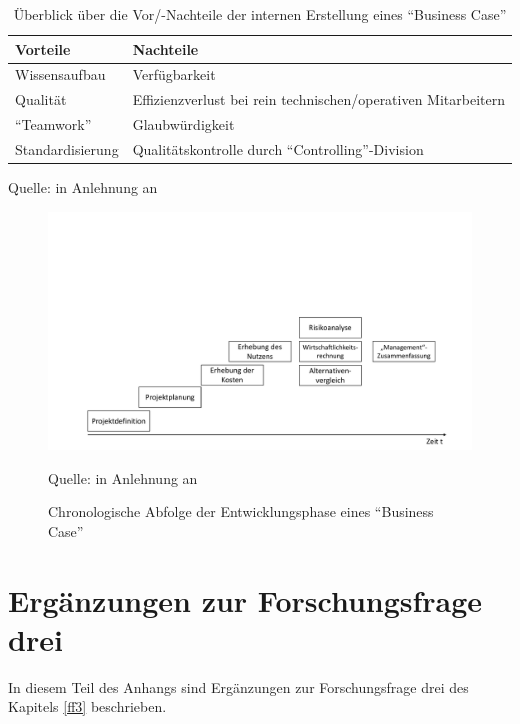 \begin{table}[h!]
	\centering
	
	\begin{tabular}{@{}ll@{}}\toprule[1.5pt]
		
		\textbf{Vorteile} & \textbf{Nachteile} \\ \midrule
		
		Wissensaufbau & Verfügbarkeit \\
		Qualität & Effizienzverlust bei rein technischen/operativen Mitarbeitern \\
		\enquote{Teamwork} & Glaubwürdigkeit \\
		Standardisierung & Qualitätskontrolle durch \enquote{Controlling}-Division \\
		
		\bottomrule[1.5pt]
	\end{tabular}
	
	\caption{Überblick über die Vor/-Nachteile der internen Erstellung eines \enquote{Business Case}}
	{\footnotesize Quelle: in Anlehnung an \cite[][S.34]{brugger_it_2009}}
	\label{tab:internVorNachteile}
	
\end{table}

\begin{figure}[H]
	\centering
	\includegraphics[scale=0.48]{img/chronoBC.pdf}
	\caption{Chronologische Abfolge der Entwicklungsphase eines \enquote{Business Case}}
	{\footnotesize Quelle: in Anlehnung an \cite[][]{herman_is_2009}}
	\label{abb:entwicklungBC}
\end{figure}

\chapter{Ergänzungen zur Forschungsfrage drei} \label{appendixFF3}
In diesem Teil des Anhangs sind Ergänzungen zur Forschungsfrage drei des Kapitels \vref{ff3} beschrieben.

